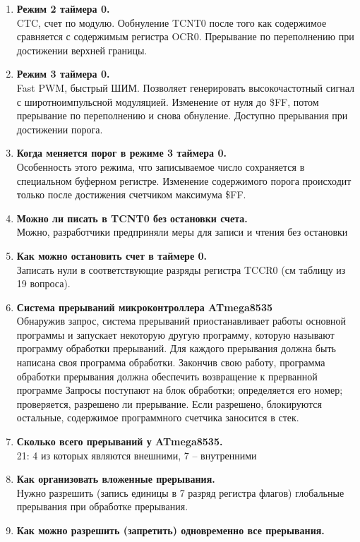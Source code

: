 \documentclass[a4paper, 12pt, twoside]{article}
\begin{document}
\begin{enumerate}
	\item \textbf{Режим 2 таймера 0.}\\
		CTC, счет по модулю. Ообнуление TCNT0 после того как содержимое сравняется с содержимым регистра OCR0. Прерывание по переполнению при достижении верхней границы.
	\item \textbf{Режим 3 таймера 0.}\\
		Fast PWM, быстрый ШИМ. Позволяет генерировать высокочастотный сигнал с широтноимпульсной модуляцией. Изменение от нуля до \$FF, потом прерывание по переполнению и снова обнуление. Доступно прерывания при достижении порога.
	\item \textbf{Когда меняется порог в режиме 3 таймера 0.}\\
		Особенность этого режима, что записываемое число сохраняется в специальном буферном регистре. Изменение содержимого порога происходит только после достижения счетчиком максимума \$FF.
	\item \textbf{Можно ли писать в TCNT0 без остановки счета.}\\
		Можно, разработчики предприняли меры для записи и чтения без остановки
	\item \textbf{Как можно остановить счет в таймере 0.}\\
		Записать нули в соответствующие разряды регистра TCCR0 (см таблицу из 19 вопроса).
	\item \textbf{Система прерываний микроконтроллера ATmega8535}\\
		Обнаружив запрос, система прерываний приостанавливает работы основной программы и запускает некоторую другую программу, которую называют программу обработки прерываний. Для каждого прерывания должна быть написана своя программа обработки. Закончив свою работу, программа обработки прерывания должна обеспечить возвращение к прерванной программе Запросы поступают на блок обработки; определяется его номер; проверяется, разрешено ли прерывание. Если разрешено, блокируются остальные, содержимое программного счетчика заносится в стек.
	\item \textbf{Сколько всего прерываний у ATmega8535.}\\
		21: 4 из которых являются внешними, 7 – внутренними 
	\item \textbf{Как организовать вложенные прерывания.}\\
		Нужно разрешить (запись единицы в 7 разряд регистра флагов) глобальные прерывания при обработке прерывания.
	\item \textbf{Как можно разрешить (запретить) одновременно все прерывания.}\\

\end{enumerate}
\end{document}
